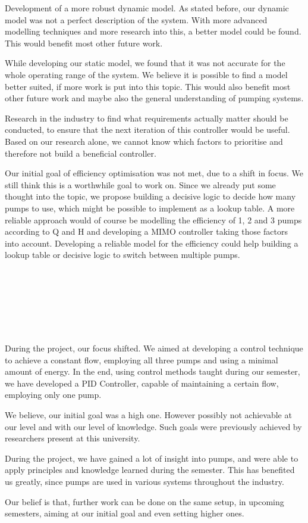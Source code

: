 Development of a more robust dynamic model.
As stated before,
our dynamic model was not a perfect description of the system.
With more advanced modelling techniques and more research into this,
a better model could be found.
This would benefit most other future work.

While developing our static model,
we found that it was not accurate for the whole operating range of the system.
We believe it is possible to find a model better suited,
if more work is put into this topic.
This would also benefit most other future work
and maybe also the general understanding of pumping systems.

Research in the industry to find what requirements actually matter should be conducted,
to ensure that the next iteration of this controller would be useful.
Based on our research alone,
we cannot know which factors to prioritise
and therefore not build a beneficial controller.

Our initial goal of efficiency optimisation was not met,
due to a shift in focus.
We still think this is a worthwhile goal to work on.
Since we already put some thought into the topic,
we propose building a decisive logic to decide how many pumps to use,
which might be possible to implement as a lookup table.
A more reliable approach would of course be modelling the efficiency of 1, 2 and 3 pumps according to Q and H
and developing a MIMO controller taking those factors into account.
Developing a reliable model for the efficiency could help building a lookup table or decisive logic to switch between multiple pumps.
\\\\\\\\\\\\\\\\
During the project, our focus shifted. We aimed at developing a control technique to achieve a constant flow, employing
all three pumps and using a minimal amount of energy.
In the end, using control methods taught during our semester,
we have developed a PID Controller, capable of maintaining a certain flow, employing only one pump.

We believe, our initial goal was a high one.
However possibly not achievable at our level and with our level of knowledge.
Such goals were previously achieved by researchers present at this university. 

During the project, we have gained a lot of insight into pumps, and were able to apply principles and knowledge
learned during the semester. This has benefited us greatly, since pumps are used in various systems throughout the industry.

Our belief is that, further work can be done on the same setup, in upcoming semesters, aiming at our initial goal and
even setting higher ones. 

